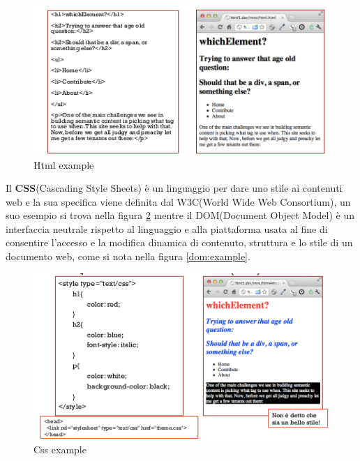 \documentclass[a4paper,12pt, oneside]{book}
\begin{document}
\begin{figure}
    \caption{Html example}
    \label{listato:htmlExample}
	\includegraphics[scale=0.9]{img/html.png}
\end{figure}
Il \textbf{CSS}(Cascading Style Sheets) è un linguaggio per dare uno stile ai contenuti web e la sua specifica
viene definita dal W3C(World Wide Web Consortium), un suo esempio si trova nella figura \ref{css:example}
mentre il DOM(Document Object Model) è un interfaccia neutrale rispetto al linguaggio e alla piattaforma
usata al fine di consentire l'accesso e la modifica dinamica di contenuto, struttura e lo stile di un
documento web, come si nota nella figura \ref{dom:example}.

\begin{figure}
    \caption{Css example}
    \label{css:example}
	\includegraphics[scale=0.9]{img/css.png}
\end{figure}
\end{document}

